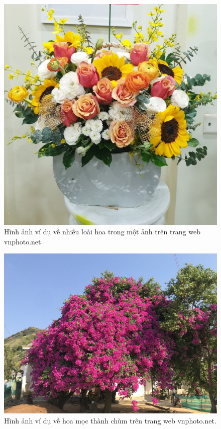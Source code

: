\documentclass[12pt]{report}
\begin{document}
		\begin{figure}[h]
			\centering
			\includegraphics[scale=0.2]{anhlanghoa}
			\caption{Hình ảnh ví dụ về nhiều loài hoa trong một ảnh trên trang web vnphoto.net}
			\label{fig:app_comment}
		\end{figure}
		\begin{figure}[h]
			\centering
			\includegraphics[scale=0.25]{anh_hoa_giay}
			\caption{Hình ảnh ví dụ về hoa mọc thành chùm trên trang web vnphoto.net.}
			\label{fig:app_comment}
		\end{figure}
\end{document}
